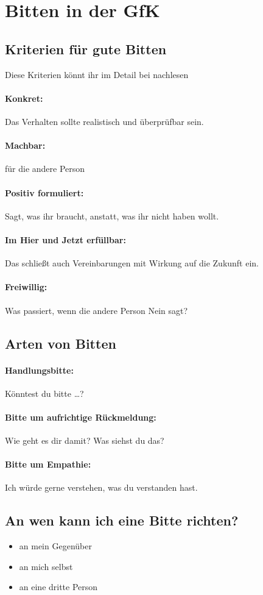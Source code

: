 \section{Bitten in der GfK}
\label{bitten}

\subsection{Kriterien für gute Bitten}

Diese Kriterien könnt ihr im Detail bei \cite[S.~85~f]{gfk-dummies} nachlesen

\paragraph{Konkret:} Das Verhalten sollte realistisch und überprüfbar sein.

\paragraph{Machbar:} für die andere Person

\paragraph{Positiv formuliert:} Sagt, was ihr braucht, anstatt, was ihr nicht haben wollt.

\paragraph{Im Hier und Jetzt erfüllbar:} Das schließt auch Vereinbarungen mit Wirkung auf die Zukunft ein.

\paragraph{Freiwillig:} Was passiert, wenn die andere Person Nein sagt?

\subsection{Arten von Bitten}

\paragraph{Handlungsbitte:} Könntest du bitte \ldots?

\paragraph{Bitte um aufrichtige Rückmeldung:} Wie geht es dir damit? Was siehst du das?

\paragraph{Bitte um Empathie:} Ich würde gerne verstehen, was du verstanden hast.

\subsection{An wen kann ich eine Bitte richten?}

\begin{itemize}
    \item an mein Gegenüber
    \item an mich selbst
    \item an eine dritte Person
\end{itemize}
